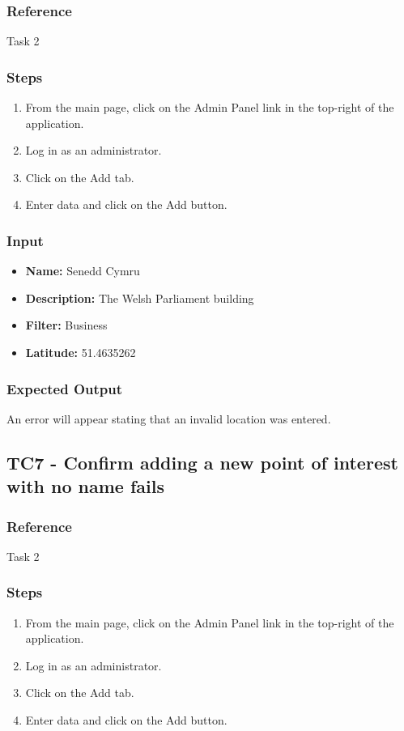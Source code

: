\subsubsection{Reference}

Task 2

\subsubsection{Steps}
\begin{enumerate}
		\item From the main page, click on the Admin Panel link in the top-right of the application.
	\item Log in as an administrator.
	\item Click on the Add tab.
	\item Enter data and click on the Add button.
\end{enumerate}	

\subsubsection{Input}
\begin{itemize}
	\item \textbf{Name: } Senedd Cymru
	\item \textbf{Description: } The Welsh Parliament building
	\item \textbf{Filter: } Business
	\item \textbf{Latitude: } 51.4635262
\end{itemize}
\subsubsection{Expected Output}
An error will appear stating that an invalid location was entered.
\subsection{TC7 - Confirm adding a new point of interest with no name fails}

\subsubsection{Reference}

Task 2

\subsubsection{Steps}
\begin{enumerate}
		\item From the main page, click on the Admin Panel link in the top-right of the application.
	\item Log in as an administrator.
	\item Click on the Add tab.
	\item Enter data and click on the Add button.
\end{enumerate}	
